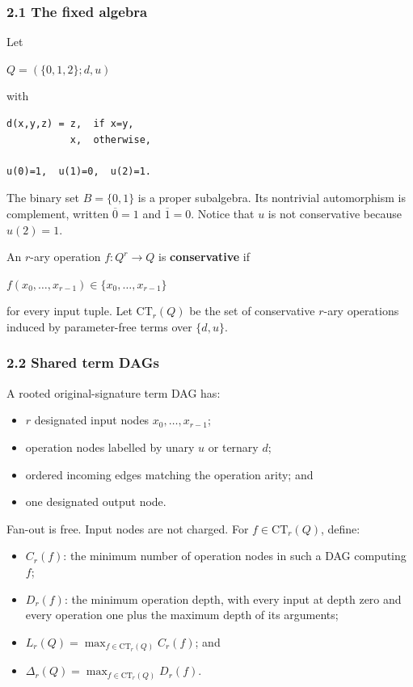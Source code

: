 \documentclass[
  11pt,
]{article}
\providecommand{\tightlist}{%
  \setlength{\itemsep}{0pt}\setlength{\parskip}{0pt}}
\theoremstyle{definition}
\theoremstyle{remark}
\begin{document}
\hypertarget{the-fixed-algebra}{%
\subsubsection{2.1 The fixed algebra}\label{the-fixed-algebra}}

Let

\(Q=(\{0,1,2\};d,u)\)

with

\begin{lstlisting}
d(x,y,z) = z,  if x=y,
           x,  otherwise,

u(0)=1,  u(1)=0,  u(2)=1.
\end{lstlisting}

The binary set \(B=\{0,1\}\) is a proper subalgebra. Its nontrivial
automorphism is complement, written \(\overline{0}=1\) and
\(\overline{1}=0\). Notice that \(u\) is not conservative because
\(u(2)=1\).

An \(r\)-ary operation \(f:Q^r\to Q\) is \textbf{conservative} if

\(f(x_0,\ldots ,x_{r-1}) \in \{x_0,\ldots ,x_{r-1}\}\)

for every input tuple. Let \(\mathrm{CT}_r(Q)\) be the set of
conservative \(r\)-ary operations induced by parameter-free terms over
\(\{d,u\}\).

\hypertarget{shared-term-dags}{%
\subsubsection{2.2 Shared term DAGs}\label{shared-term-dags}}

A rooted original-signature term DAG has:

\begin{itemize}
\tightlist
\item
  \(r\) designated input nodes \(x_0,\ldots ,x_{r-1}\);
\item
  operation nodes labelled by unary \(u\) or ternary \(d\);
\item
  ordered incoming edges matching the operation arity; and
\item
  one designated output node.
\end{itemize}

Fan-out is free. Input nodes are not charged. For
\(f \in \mathrm{CT}_r(Q)\), define:

\begin{itemize}
\tightlist
\item
  \(C_r(f)\): the minimum number of operation nodes in such a DAG
  computing \(f\);
\item
  \(D_r(f)\): the minimum operation depth, with every input at depth
  zero and every operation one plus the maximum depth of its arguments;
\item
  \(L_r(Q)=\max_{f \in \mathrm{CT}_r(Q)} C_r(f)\); and
\item
  \(\Delta_r(Q)=\max_{f \in \mathrm{CT}_r(Q)} D_r(f)\).
\end{itemize}
\end{document}
